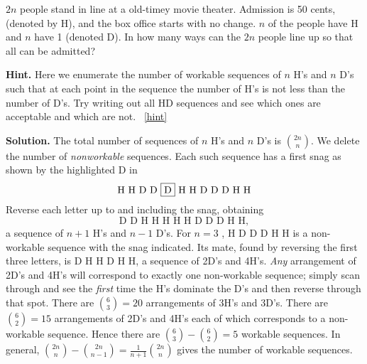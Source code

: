 \documentclass{book}
\begin{document}
\setcounter{project}{173}
\addtocounter{project}{-1}
\begin{activity}[]\label{act-hdseq}
\hypertarget{p-1033}{}%
\(2n\) people stand in line at a old-timey movie theater. Admission is 50 cents, (denoted by H), and the box office starts with no change. \(n\) of the people have H and \(n\) have \textdollar{}1 (denoted D). In how many ways can the \(2n\) people line up so that all can be admitted?%
\par\smallskip%
\noindent\textbf{Hint.}\hypertarget{hint-113}{}\quad%
\hypertarget{p-1034}{}%
Here we enumerate the number of workable sequences of \(n\) H's and \(n\) D's such that at each point in the sequence the number of H's is not less than the number of D's.  Try writing out all HD sequences and see which ones are acceptable and which are not.%
~\hfill{\tiny\hyperlink{a-173}{[hint]}\hypertarget{q-173}{}}\par\smallskip%
\noindent\textbf{Solution.}\hypertarget{solution-103}{}\quad%
\hypertarget{p-1035}{}%
The total number of sequences of \(n\) H's and \(n\) D's is \(\binom{2n}{n}\). We delete the number of \emph{nonworkable} sequences. Each such sequence has a first snag as shown by the highlighted D in%
\begin{equation*}
\text{H\ H\ D\ D\ \alert{D}\ H\ H\ D\ D\ D\ H\ H}
\end{equation*}
Reverse each letter up to and including the snag, obtaining%
\begin{equation*}
\text{D D H H H H H D D D H H},
\end{equation*}
a sequence of \(n+1\) H's and \(n-1\) D's. For \(n = 3\) , H D \alert{D} D H H is a non-workable sequence with the snag indicated. Its mate, found by reversing the first three letters, is D H H D H H, a sequence of 2D's and 4H's. \emph{Any} arrangement of 2D's and 4H's will correspond to exactly one non-workable sequence; simply scan through and see the \emph{first} time the H's dominate the D's and then reverse through that spot. There are \(\binom{6}{3}
= 20\) arrangements of 3H's and 3D's. There are \(\binom{6}{2}
= 15\) arrangements of 2D's and 4H's each of which corresponds to a non-workable sequence. Hence there are \(\binom{6}{3}
-\binom{6}{2} = 5\) workable sequences. In general, \(\binom{2n}{n}  - \binom{2n}{n - 1} = \frac{1}{n + 1}\binom{2n}{n}\) gives the number of workable sequences.%
\end{activity}
\end{document}
